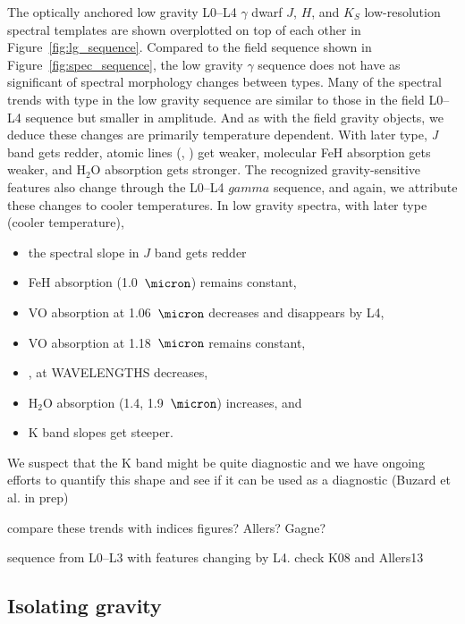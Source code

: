 \documentclass[12pt,preprint]{aastex}
\begin{document}
The optically anchored low gravity L0--L4 $\gamma$ dwarf $J$, $H$, and $K_S$ low-resolution spectral templates are shown overplotted on top of each other in Figure~\ref{fig:lg_sequence}. 
Compared to the field sequence shown in Figure~\ref{fig:spec_sequence}, the low gravity $\gamma$ sequence does not have as significant of spectral morphology changes between types.
Many of the spectral trends with type in the low gravity sequence are similar to those in the field L0--L4 sequence but smaller in amplitude. And as with the field gravity objects, we deduce these changes are primarily temperature dependent. With later type, \emph{J} band gets redder, atomic lines (, ) get weaker, molecular FeH absorption gets weaker, and H$_2$O absorption gets stronger. The recognized gravity-sensitive features also change through the L0--L4 $gamma$ sequence, and again, we attribute these changes to cooler temperatures.
In low gravity spectra, with later type (cooler temperature),
\begin{itemize}
\item the spectral slope in $J$ band gets redder 
\item FeH absorption (1.0~$\micron$) remains constant,
\item VO absorption at 1.06~$\micron$ decreases and disappears by L4,
\item VO absorption at 1.18~$\micron$ remains constant,
\item {},  at WAVELENGTHS decreases, 
\item H$_2$O absorption (1.4, 1.9~$\micron$) increases, and
\item K band slopes get steeper. 
\end{itemize}

We suspect that the K band might be quite diagnostic and we have ongoing efforts to quantify this shape and see if it can be used as a diagnostic (Buzard et al. in prep)

compare these trends with indices figures? Allers? Gagne?

sequence from L0--L3 with features changing by L4. check K08 and Allers13

\subsection{Isolating gravity} 
\end{document}

